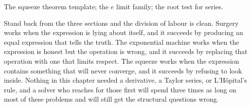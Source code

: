 \begin{seealsob}The squeeze theorem template; the $e$ limit family; the root test for series.\end{seealsob}

Stand back from the three sections and the division of labour is clean. Surgery works when the expression is lying about itself, and it succeeds by producing an equal expression that tells the truth. The exponential machine works when the expression is honest but the operation is wrong, and it succeeds by replacing that operation with one that limits respect. The squeeze works when the expression contains something that will never converge, and it succeeds by refusing to look inside. Nothing in this chapter needed a derivative, a Taylor series, or L'H\^opital's rule, and a solver who reaches for those first will spend three times as long on most of these problems and will still get the structural questions wrong.

